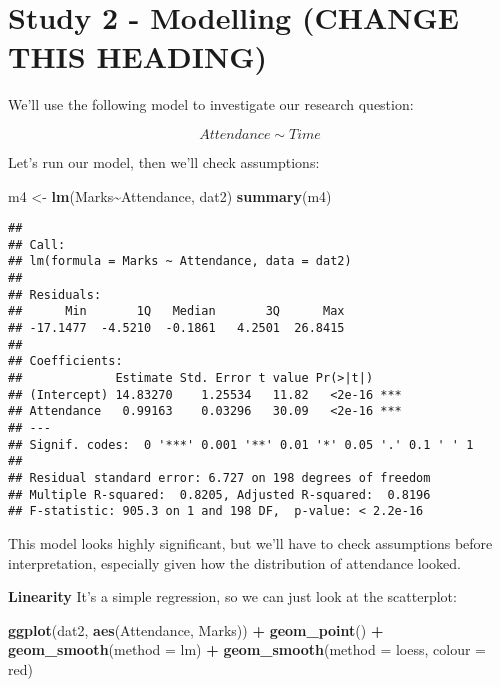 \documentclass[
]{article}
\newenvironment{Shaded}{\begin{snugshade}}{\end{snugshade}}
\newcommand{\AttributeTok}[1]{\textcolor[rgb]{0.13,0.29,0.53}{#1}}
\newcommand{\FunctionTok}[1]{\textcolor[rgb]{0.13,0.29,0.53}{\textbf{#1}}}
\newcommand{\NormalTok}[1]{#1}
\newcommand{\OtherTok}[1]{\textcolor[rgb]{0.56,0.35,0.01}{#1}}
\newcommand{\SpecialCharTok}[1]{\textcolor[rgb]{0.81,0.36,0.00}{\textbf{#1}}}
\newcommand{\StringTok}[1]{\textcolor[rgb]{0.31,0.60,0.02}{#1}}
\begin{document}
\hypertarget{study-2---modelling-change-this-heading}{%
\section{Study 2 - Modelling (CHANGE THIS HEADING)}\label{study-2---modelling-change-this-heading}}

We'll use the following model to investigate our research question:

\[Attendance \sim Time\]

Let's run our model, then we'll check assumptions:

\begin{Shaded}
\begin{Highlighting}[]
\NormalTok{m4 }\OtherTok{\textless{}{-}} \FunctionTok{lm}\NormalTok{(Marks}\SpecialCharTok{\textasciitilde{}}\NormalTok{Attendance, dat2)}
\FunctionTok{summary}\NormalTok{(m4)}
\end{Highlighting}
\end{Shaded}

\begin{verbatim}
## 
## Call:
## lm(formula = Marks ~ Attendance, data = dat2)
## 
## Residuals:
##      Min       1Q   Median       3Q      Max 
## -17.1477  -4.5210  -0.1861   4.2501  26.8415 
## 
## Coefficients:
##             Estimate Std. Error t value Pr(>|t|)    
## (Intercept) 14.83270    1.25534   11.82   <2e-16 ***
## Attendance   0.99163    0.03296   30.09   <2e-16 ***
## ---
## Signif. codes:  0 '***' 0.001 '**' 0.01 '*' 0.05 '.' 0.1 ' ' 1
## 
## Residual standard error: 6.727 on 198 degrees of freedom
## Multiple R-squared:  0.8205, Adjusted R-squared:  0.8196 
## F-statistic: 905.3 on 1 and 198 DF,  p-value: < 2.2e-16
\end{verbatim}

This model looks highly significant, but we'll have to check assumptions before interpretation, especially given how the distribution of attendance looked.

\textbf{Linearity}
It's a simple regression, so we can just look at the scatterplot:

\begin{Shaded}
\begin{Highlighting}[]
\FunctionTok{ggplot}\NormalTok{(dat2, }\FunctionTok{aes}\NormalTok{(Attendance, Marks)) }\SpecialCharTok{+} \FunctionTok{geom\_point}\NormalTok{() }\SpecialCharTok{+} 
  \FunctionTok{geom\_smooth}\NormalTok{(}\AttributeTok{method =} \StringTok{\textquotesingle{}lm\textquotesingle{}}\NormalTok{) }\SpecialCharTok{+} 
  \FunctionTok{geom\_smooth}\NormalTok{(}\AttributeTok{method =} \StringTok{\textquotesingle{}loess\textquotesingle{}}\NormalTok{, }\AttributeTok{colour =} \StringTok{\textquotesingle{}red\textquotesingle{}}\NormalTok{)}
\end{Highlighting}
\end{Shaded}
\end{document}
